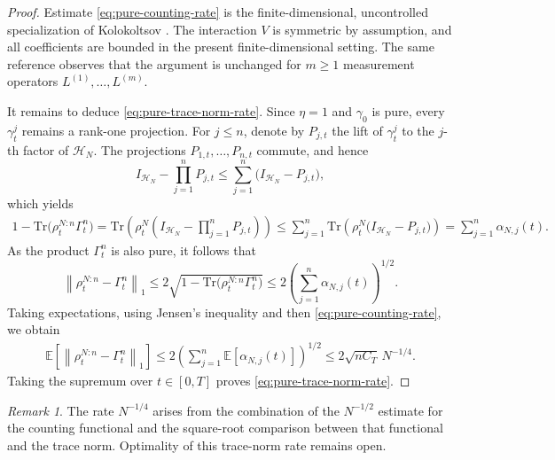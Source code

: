 \documentclass[10pt,a4paper,reqno]{amsart}
\numberwithin{equation}{section}
\theoremstyle{plain}
\theoremstyle{definition}
\theoremstyle{remark}
\newtheorem{remark}[theorem]{Remark}
\newcommand{\Tr}{\mathrm{Tr}}
\newcommand{\E}{\mathbb E}
\newcommand{\HH}{\mathcal H}
\newcommand{\1}{\mathbf 1}
\begin{document}
\begin{proof}
Estimate \eqref{eq:pure-counting-rate} is the finite-dimensional,
uncontrolled specialization of Kolokoltsov
\cite[Theorem~3.1]{kolokoltsov2021}.  The interaction \(V\) is symmetric by
assumption, and all coefficients are bounded in the present finite-dimensional
setting.  The same reference observes that the argument is unchanged for
\(m\ge1\) measurement operators
\(
  L^{(1)},\ldots,L^{(m)} .
\)

It remains to deduce \eqref{eq:pure-trace-norm-rate}.  Since $\eta=1$ and
$\gamma_0$ is pure, every $\gamma_t^j$ remains a rank-one projection.
For $j\le n$, denote by $P_{j,t}$ the lift of $\gamma_t^j$ to the
$j$-th factor of $\HH_N$.  The projections $P_{1,t},\ldots,P_{n,t}$
commute, and hence
\begin{equation}
  I_{\HH_N}
  -
  \prod_{j=1}^nP_{j,t}
  \le
  \sum_{j=1}^n
  \bigl(I_{\HH_N}-P_{j,t}\bigr),
  \label{eq:commuting-projection-bound}
\end{equation}
which yields
\begin{align}\label{eq:product-counting-bound}
  1-\Tr\bigl(\rho_t^{N:n}\Gamma_t^n\bigr)
  =
  \Tr\left(
    \rho_t^N
    \left(
      I_{\HH_N}-\prod_{j=1}^nP_{j,t}
    \right)
  \right)
 \le
  \sum_{j=1}^n
  \Tr\left(
    \rho_t^N
    \bigl(I_{\HH_N}-P_{j,t}\bigr)
  \right)=
  \sum_{j=1}^n\alpha_{N,j}(t).
\end{align}
As the product $\Gamma_t^n$ is also pure,  it follows that 
\[
  \left\|
    \rho_t^{N:n}-\Gamma_t^n
  \right\|_1
  \le
  2\sqrt{
    1-\Tr\bigl(\rho_t^{N:n}\Gamma_t^n\bigr)
  }
  \le
  2\left(
    \sum_{j=1}^n\alpha_{N,j}(t)
  \right)^{1/2}.
\]
Taking expectations, using Jensen's inequality and then
\eqref{eq:pure-counting-rate}, we obtain
\[
\begin{aligned}
  \E\left[
    \left\|
      \rho_t^{N:n}-\Gamma_t^n
    \right\|_1
  \right]
  \le
  2
  \left(
    \sum_{j=1}^n
    \E[\alpha_{N,j}(t)]
  \right)^{1/2}
  \le
  2\sqrt{nC_T}\,N^{-1/4}.
\end{aligned}
\]
Taking the supremum over $t\in[0,T]$ proves
\eqref{eq:pure-trace-norm-rate}.
\end{proof}

\begin{remark}
The rate $N^{-1/4}$ arises from the combination of the
$N^{-1/2}$ estimate for the counting functional and the square-root
comparison between that functional and the trace norm.  Optimality of this trace-norm rate remains open.  
\end{remark}
\end{document}

